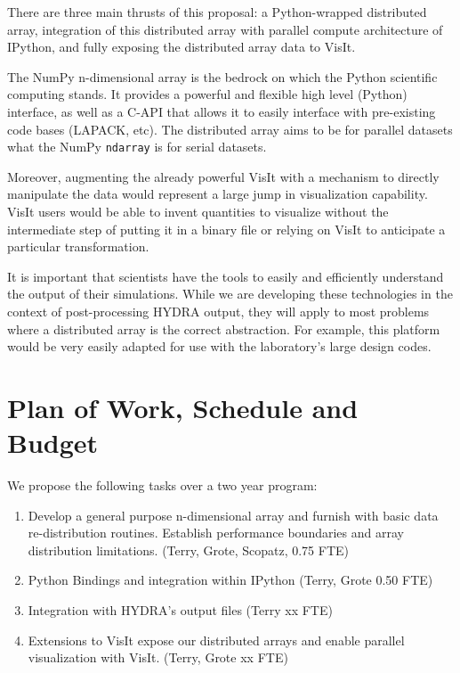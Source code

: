 \documentclass[letterpaper,11pt]{article}
\begin{document}
There are three main thrusts of this proposal: a Python-wrapped distributed array, integration 
of this distributed array with parallel compute architecture of IPython, and fully exposing 
the distributed array data to VisIt.  

The NumPy n-dimensional array is the bedrock on which the Python scientific computing stands.  
It provides a powerful and flexible high level (Python) interface, as well as a C-API that 
allows it to easily interface with pre-existing code bases (LAPACK, etc).  The distributed 
array aims to be for parallel datasets what the NumPy \texttt{ndarray} is for serial datasets.

Moreover, augmenting the already powerful VisIt with a mechanism to directly manipulate the 
data would represent a large jump in visualization capability.  VisIt users would be able 
to invent quantities to visualize without the intermediate step of putting it in a binary 
file or relying on VisIt to anticipate a particular transformation.

It is important that 
scientists have the tools to easily and efficiently understand the output of their
simulations.  While we are developing these technologies in the context of post-processing HYDRA output, 
they will apply to most problems where a distributed array is the correct abstraction.  
For example, this platform would be very easily adapted for use with the laboratory's large 
design codes.




\section*{Plan of Work, Schedule and Budget}

We propose the following tasks over a two year program:

\begin{enumerate}
	\item Develop a general purpose n-dimensional array and furnish with basic data 
		re-distribution routines.  Establish performance boundaries and array distribution 
		limitations. (Terry, Grote, Scopatz, 0.75 FTE) 

	\item Python Bindings and integration within IPython (Terry, Grote 0.50 FTE)

	\item Integration with HYDRA's output files (Terry xx FTE)

	\item Extensions to VisIt expose our distributed arrays and enable parallel visualization 
		with VisIt. (Terry, Grote xx FTE)

\end{enumerate}
\end{document}
